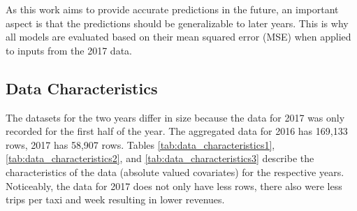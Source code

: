 \documentclass[twoside,11pt]{article}
\begin{document}
As this work aims to provide accurate predictions in the future, an important aspect is that the predictions should be generalizable to later years. This is why all models are evaluated based on their mean squared error (MSE) when applied to inputs from the 2017 data.

\subsection{Data Characteristics}

The datasets for the two years differ in size because the data for 2017 was only recorded for the first half of the year. The aggregated data for 2016 has 169,133 rows, 2017 has 58,907 rows. Tables \ref{tab:data_characteristics1}, \ref{tab:data_characteristics2}, and \ref{tab:data_characteristics3} describe the characteristics of the data (absolute valued covariates) for the respective years. Noticeably, the data for 2017 does not only have less rows, there also were less trips per taxi and week resulting in lower revenues.
\end{document}
